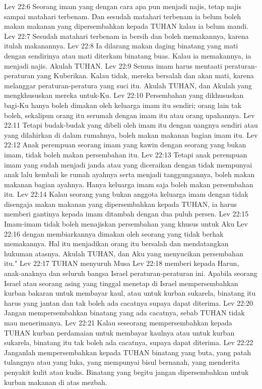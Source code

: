 Lev 22:6  Seorang imam yang dengan cara apa pun menjadi najis, tetap najis sampai matahari terbenam. Dan sesudah matahari terbenam ia belum boleh makan makanan yang dipersembahkan kepada TUHAN kalau ia belum mandi.
Lev 22:7  Sesudah matahari terbenam ia bersih dan boleh memakannya, karena itulah makanannya.
Lev 22:8  Ia dilarang makan daging binatang yang mati dengan sendirinya atau mati diterkam binatang buas. Kalau ia memakannya, ia menjadi najis. Akulah TUHAN.
Lev 22:9  Semua imam harus mentaati peraturan-peraturan yang Kuberikan. Kalau tidak, mereka bersalah dan akan mati, karena melanggar peraturan-peratura yang suci itu. Akulah TUHAN, dan Akulah yang mengkhususkan mereka untuk-Ku.
Lev 22:10  Persembahan yang dikhususkan bagi-Ku hanya boleh dimakan oleh keluarga imam itu sendiri; orang lain tak boleh, sekalipun orang itu serumah dengan imam itu atau orang upahannya.
Lev 22:11  Tetapi budak-budak yang dibeli oleh imam itu dengan uangnya sendiri atau yang dilahirkan di dalam rumahnya, boleh makan makanan bagian imam itu.
Lev 22:12  Anak perempuan seorang imam yang kawin dengan seorang yang bukan imam, tidak boleh makan persembahan itu.
Lev 22:13  Tetapi anak perempuan imam yang sudah menjadi janda atau yang diceraikan dengan tidak mempunyai anak lalu kembali ke rumah ayahnya serta menjadi tanggungannya, boleh makan makanan bagian ayahnya. Hanya keluarga imam saja boleh makan persembahan itu.
Lev 22:14  Kalau seorang yang bukan anggota keluarga imam dengan tidak disengaja makan makanan yang dipersembahkan kepada TUHAN, ia harus memberi gantinya kepada imam ditambah dengan dua puluh persen.
Lev 22:15  Imam-imam tidak boleh menajiskan persembahan yang khusus untuk Aku
Lev 22:16  dengan membiarkannya dimakan oleh seorang yang tidak berhak memakannya. Hal itu menjadikan orang itu bersalah dan mendatangkan hukuman atasnya. Akulah TUHAN, dan Aku yang menyucikan persembahan itu."
Lev 22:17  TUHAN menyuruh Musa
Lev 22:18  memberi kepada Harun, anak-anaknya dan seluruh bangsa Israel peraturan-peraturan ini. Apabila seorang Israel atau seorang asing yang tinggal menetap di Israel mempersembahkan kurban bakaran untuk membayar kaul, atau untuk kurban sukarela, binatang itu harus yang jantan dan tak boleh ada cacatnya supaya dapat diterima.
Lev 22:20  Jangan mempersembahkan binatang yang ada cacatnya, sebab TUHAN tidak mau menerimanya.
Lev 22:21  Kalau seseorang mempersembahkan kepada TUHAN kurban perdamaian untuk membayar kaulnya atau untuk kurban sukarela, binatang itu tak boleh ada cacatnya, supaya dapat diterima.
Lev 22:22  Janganlah mempersembahkan kepada TUHAN binatang yang buta, yang patah tulangnya atau yang luka, yang mempunyai bisul bernanah, yang menderita penyakit kulit atau kudis. Binatang yang begitu jangan dipersembahkan untuk kurban makanan di atas mezbah.
